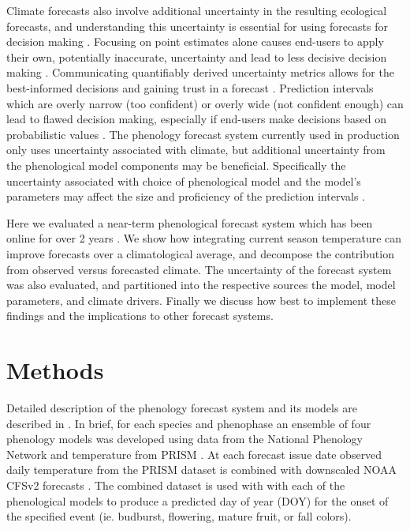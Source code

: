 \documentclass[fleqn,10pt,lineno]{wlpeerj}
\begin{document}
Climate forecasts also involve additional uncertainty in the resulting ecological forecasts, and understanding this  uncertainty is essential for using forecasts for decision making \citep{clark2001, dietze2017, dietze2018}. Focusing on point estimates alone causes end-users to apply their own, potentially inaccurate, uncertainty and lead to less decisive decision making \citep{joslyn2010, savelli2013}. Communicating quantifiably derived uncertainty metrics allows for the best-informed decisions and gaining trust in a forecast \citep{raftery2014}. Prediction intervals which are overly narrow (too confident) or overly wide (not confident enough) can lead to flawed decision making, especially if end-users make decisions based on probabilistic values \citep{zhu2002}. The phenology forecast system currently used in production  only uses uncertainty associated with climate, but additional uncertainty from the phenological model components may be beneficial. Specifically the uncertainty associated with choice of phenological model and the model’s parameters may affect the size and proficiency of the prediction intervals \citep{migliavacca2012}. 

Here we evaluated a near-term phenological forecast system which has been online for over 2 years \citep{taylor2020a}. We show how integrating current season temperature can improve forecasts over a climatological average, and decompose the contribution from observed versus forecasted climate. The uncertainty of the forecast system was also evaluated, and partitioned into the respective sources the model, model parameters, and climate drivers. Finally we discuss how best to implement these findings and the implications to other forecast systems. 


\section*{Methods}

Detailed description of the phenology forecast system and its models are described in \cite{taylor2020a}. In brief, for each species and phenophase an ensemble of four phenology models was developed using data from the National Phenology Network \citep{npndata2018} and temperature from PRISM \citep{prismdata}. At each forecast issue date observed daily temperature from the PRISM dataset is combined with downscaled NOAA CFSv2 forecasts \citep{saha2014}. The combined dataset is used with with each of the phenological models to produce a predicted day of year (DOY) for the onset of the specified event (ie. budburst, flowering, mature fruit, or fall colors).
\end{document}
